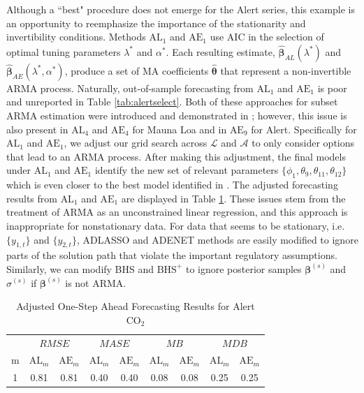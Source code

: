 Although a ``best" procedure does not emerge for the Alert series, this example is an opportunity to reemphasize the importance of the stationarity and invertibility conditions. Methods $\textrm{AL}_1$ and $\textrm{AE}_1$  use AIC in the selection of optimal tuning parameters $\lambda^*$ and $\alpha^*$. Each resulting estimate, $\hat{\bm{\beta}}_{AL}(\lambda^*)$ and $\hat{\bm{\beta}}_{AE}(\lambda^*,\alpha^*)$, produce a set of MA coefficients $\hat{\bm{\theta}}$ that represent a non-invertible ARMA process. Naturally, out-of-sample forecasting from $\textrm{AL}_1$ and $\textrm{AE}_1$ is poor and unreported in Table \ref{tab:alertselect}. Both of these approaches for subset ARMA estimation were introduced and demonstrated in \cite{Chen2011}; however, this issue is also present in $\textrm{AL}_4$ and $\textrm{AE}_4$ for Mauna Loa and in $\textrm{AE}_9$ for Alert. Specifically for $\textrm{AL}_1$ and $\textrm{AE}_1$, we adjust our grid search across $\mathcal{L}$ and $\mathcal{A}$ to only consider options that lead to an ARMA process. After making this adjustment, the final models under $\textrm{AL}_1$ and $\textrm{AE}_1$ identify the new set of relevant parameters $\{\phi_1,\theta_9,\theta_{11},\theta_{12}\}$ which is even closer to the best model identified in \cite{Chen2011}. The adjusted forecasting results from $\textrm{AL}_1$ and $\textrm{AE}_1$ are displayed in Table \ref{tab:alertselect2}. These issues stem from the treatment of ARMA as an unconstrained linear regression, and this approach is inappropriate for nonstationary data. For data that seems to be stationary, i.e. $\{y_{1,t}\}$ and $\{y_{2,t}\}$, ADLASSO and ADENET methods are easily modified to ignore parts of the solution path that violate the important regulatory assumptions. Similarly, we can modify BHS and $\textrm{BHS}^+$ to ignore posterior samples $\bm{\beta}^{(s)}$ and $\sigma^{(s)}$ if $\bm{\beta}^{(s)}$ is not ARMA.

\begin{table}[htbp]
\footnotesize
\centering
\caption{Adjusted One-Step Ahead Forecasting Results for Alert $\textrm{CO}_2$}
\begin{tabular}{c|cc|cc|cc|cc}
  \hline
   & \multicolumn{2}{c|}{$RMSE$} & \multicolumn{2}{c|}{$MASE$} &
  \multicolumn{2}{c|}{$MB$} & \multicolumn{2}{c}{$MDB$}\\
   m & $\textrm{AL}_m$ & $\textrm{AE}_m$ &
  $\textrm{AL}_m$ & $\textrm{AE}_m$ &
  $\textrm{AL}_m$ & $\textrm{AE}_m$ &
  $\textrm{AL}_m$ & $\textrm{AE}_m$ \\
  \hline
  1 & 0.81 & 0.81 & 0.40 & 0.40 & 0.08 & 0.08 & 0.25 & 0.25 \\ 
  \hline
\end{tabular}
\label{tab:alertselect2}
\end{table}



